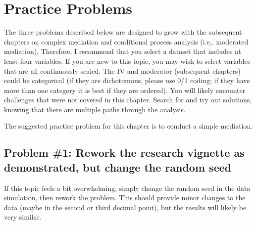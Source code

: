\documentclass[
]{book}
\begin{document}
\hypertarget{practice-problems-4}{%
\section{Practice Problems}\label{practice-problems-4}}

The three problems described below are designed to grow with the subsequent chapters on complex mediation and conditional process analysis (i.e,. moderated mediation). Therefore, I recommend that you select a dataset that includes at least four variables. If you are new to this topic, you may wish to select variables that are all continuously scaled. The IV and moderator (subsequent chapters) could be categorical (if they are dichotomous, please use 0/1 coding; if they have more than one category it is best if they are ordered). You will likely encounter challenges that were not covered in this chapter. Search for and try out solutions, knowing that there are multiple paths through the analysis.

The suggested practice problem for this chapter is to conduct a simple mediation.

\hypertarget{problem-1-rework-the-research-vignette-as-demonstrated-but-change-the-random-seed}{%
\subsection{Problem \#1: Rework the research vignette as demonstrated, but change the random seed}\label{problem-1-rework-the-research-vignette-as-demonstrated-but-change-the-random-seed}}

If this topic feels a bit overwhelming, simply change the random seed in the data simulation, then rework the problem. This should provide minor changes to the data (maybe in the second or third decimal point), but the results will likely be very similar.
\end{document}
